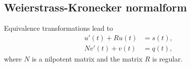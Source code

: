 	\subsection*{Weierstrass-Kronecker normalform}
	
	\begin{frame}
		\vfill
		
			Equivalence transformations lead to
		\begin{equation}
			\label{transformed-DAE-const-coeff}
			\begin{aligned}
				u'(t) + Ru(t) &= s(t), \\
				Nv'(t) + v(t) &= q(t),
			\end{aligned}
		\end{equation}
		where $N$ is a nilpotent matrix and the matrix $R$ is regular.
		\vfill
	\end{frame}
	
